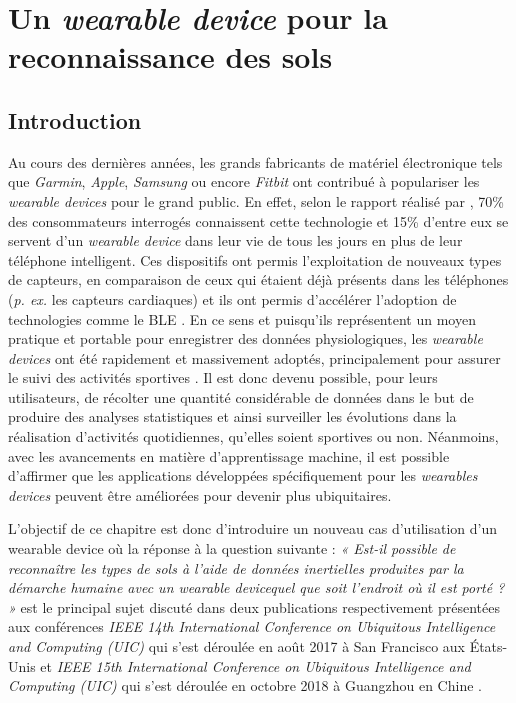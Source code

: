 \chapter{Un \textit{wearable device} pour la reconnaissance des sols}
\label{chap:4}

\section{Introduction}

Au cours des dernières années, les grands fabricants de matériel électronique tels que \textit{Garmin}, \textit{Apple}, \textit{Samsung} ou encore \textit{Fitbit} ont contribué à populariser les \textit{wearable devices} pour le grand public. En effet, selon le rapport réalisé par \cite{Nielsen2014}, 70\% des consommateurs interrogés connaissent cette technologie et 15\% d'entre eux se servent d'un \textit{wearable device} dans leur vie de tous les jours en plus de leur téléphone intelligent. Ces dispositifs ont permis l'exploitation de nouveaux types de capteurs, en comparaison de ceux qui étaient déjà présents dans les téléphones (\textit{p. ex.} les capteurs cardiaques) et ils ont permis d'accélérer l'adoption de technologies comme le \acs{BLE} \citep{Taplett}. En ce sens et puisqu'ils représentent un moyen pratique et portable pour enregistrer des données physiologiques,  les \textit{wearable devices} ont été rapidement et massivement adoptés, principalement pour assurer le suivi des activités sportives \citep{NPDGroup2015}. Il est donc devenu possible, pour leurs utilisateurs, de récolter une quantité considérable de données dans le but de produire des analyses statistiques et ainsi surveiller les évolutions dans la réalisation d'activités quotidiennes, qu'elles soient sportives ou non. Néanmoins, avec les avancements en matière d'apprentissage machine, il est possible d'affirmer que les applications développées spécifiquement pour les \textit{wearables devices} peuvent être améliorées pour devenir plus ubiquitaires.

L'objectif de ce chapitre est donc d'introduire un nouveau cas d'utilisation d'un wearable device où la réponse à la question suivante : \textit{« Est-il possible de reconnaître les types de sols à l'aide de données inertielles produites par la démarche humaine avec un wearable device\textemdash quel que soit l'endroit où il est porté ? »} est le principal sujet discuté dans deux publications respectivement présentées aux conférences \textit{IEEE 14th International Conference on Ubiquitous Intelligence and Computing (UIC)} qui s'est déroulée en août 2017 à San Francisco aux États-Unis \citep{Thullier2017} et \textit{IEEE 15th International Conference on Ubiquitous Intelligence and Computing (UIC)} qui s'est déroulée en octobre 2018 à Guangzhou en Chine \citep{Thullier2018}.

